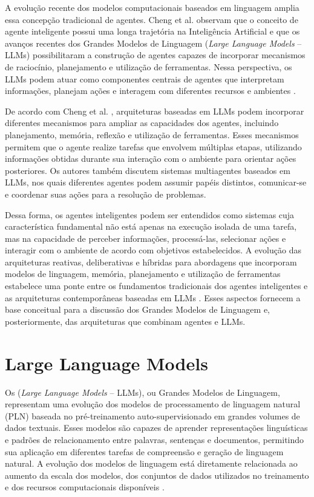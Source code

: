 

A evolução recente dos modelos computacionais baseados em linguagem amplia
essa concepção tradicional de agentes. Cheng et al. \cite{cheng2026}
observam que o conceito de agente inteligente possui uma longa trajetória na
Inteligência Artificial e que os avanços recentes dos Grandes Modelos de
Linguagem (\textit{Large Language Models} -- LLMs) possibilitaram a
construção de agentes capazes de incorporar mecanismos de raciocínio,
planejamento e utilização de ferramentas. Nessa perspectiva, os LLMs podem
atuar como componentes centrais de agentes que interpretam informações,
planejam ações e interagem com diferentes recursos e ambientes
\cite{cheng2026}.

De acordo com Cheng et al. \cite{cheng2026}, arquiteturas baseadas em LLMs
podem incorporar diferentes mecanismos para ampliar as capacidades dos
agentes, incluindo planejamento, memória, reflexão e utilização de
ferramentas. Esses mecanismos permitem que o agente realize tarefas que
envolvem múltiplas etapas, utilizando informações obtidas durante sua
interação com o ambiente para orientar ações posteriores. Os autores também
discutem sistemas multiagentes baseados em LLMs, nos quais diferentes agentes
podem assumir papéis distintos, comunicar-se e coordenar suas ações para a
resolução de problemas.

Dessa forma, os agentes inteligentes podem ser entendidos como sistemas cuja
característica fundamental não está apenas na execução isolada de uma tarefa,
mas na capacidade de perceber informações, processá-las, selecionar ações e
interagir com o ambiente de acordo com objetivos estabelecidos. A evolução
das arquiteturas reativas, deliberativas e híbridas para abordagens que
incorporam modelos de linguagem, memória, planejamento e utilização de
ferramentas estabelece uma ponte entre os fundamentos tradicionais dos
agentes inteligentes e as arquiteturas contemporâneas baseadas em LLMs
\cite{muller1999,cheng2026}. Esses aspectos fornecem a base conceitual para
a discussão dos Grandes Modelos de Linguagem e, posteriormente, das
arquiteturas que combinam agentes e LLMs.

\section{Large Language Models}
\label{sec:llm}

Os (\textit{Large Language Models} -- LLMs), ou Grandes Modelos de Linguagem, representam uma evolução dos modelos de processamento de linguagem natural (PLN) baseada no pré-treinamento auto-supervisionado em grandes volumes de dados textuais. Esses modelos são capazes de aprender representações linguísticas e padrões de relacionamento entre palavras, sentenças e documentos, permitindo sua aplicação em diferentes tarefas de compreensão e geração de linguagem natural. A evolução dos modelos de linguagem está diretamente relacionada ao aumento da escala dos modelos, dos conjuntos de dados utilizados no treinamento e dos recursos computacionais disponíveis \cite{zhao2026survey}.

